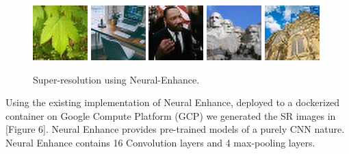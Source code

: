 \documentclass[letterpaper,12pt]{article}
\begin{document}
\begin{figure}[h!]
    \includegraphics[width=.2\textwidth]{alexjc_neural-enhance/green-maple-leaf.jpg}\hfill
    \includegraphics[width=.2\textwidth]{alexjc_neural-enhance/home-office.jpg}\hfill
    \includegraphics[width=.2\textwidth]{alexjc_neural-enhance/martin-luther-king.jpg}\hfill
    \includegraphics[width=.2\textwidth]{alexjc_neural-enhance/mount-rushmore.jpg}\hfill
    \includegraphics[width=.2\textwidth]{alexjc_neural-enhance/salisbury-cathedral.jpg}
    \caption{Super-resolution using Neural-Enhance.}
\end{figure}

Using the existing implementation of Neural Enhance\cite{AlexJC}, deployed to a dockerized container on Google Compute Platform (GCP) we generated the SR images in [Figure 6]. Neural Enhance provides pre-trained models of a purely CNN nature. Neural Enhance contains 16 Convolution layers and 4 max-pooling layers.

\pagebreak
\end{document}
